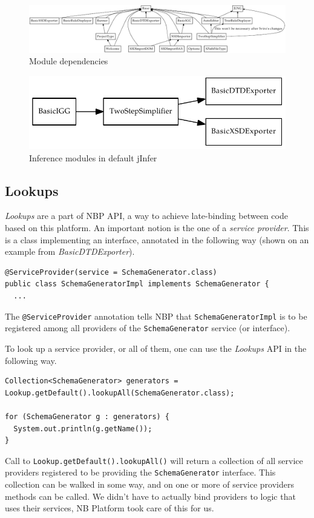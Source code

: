 \documentclass[a4paper,10pt,oneside]{article}
\newcommand{\myscale}{0.74}
\newcommand{\code}[1]{\texttt{#1}}
\newcommand{\jmodule}[1]{\emph{#1}}
\begin{document}
\begin{figure}
	\centering\includegraphics[scale=1]{module_deps}
	\caption{Module dependencies} \label{module_deps}
\end{figure}

\begin{figure}
	\centering\includegraphics[scale=\myscale]{modules_inference}
	\caption{Inference modules in default jInfer} \label{modules_inference}
\end{figure}

\subsection{Lookups} \label{section_lookups}
\emph{Lookups} are a part of NBP API, a way to achieve late-binding between code based on this platform. An important notion is the one of a \emph{service provider}. This is a class implementing an interface, annotated in the following way (shown on an example from \jmodule{BasicDTDExporter}).
\begin{verbatim}
@ServiceProvider(service = SchemaGenerator.class)
public class SchemaGeneratorImpl implements SchemaGenerator {
  ...
\end{verbatim}
The \code{@ServiceProvider} annotation tells NBP that \code{SchemaGeneratorImpl} is to be registered among all providers of the \code{SchemaGenerator} service (or interface).

To look up a service provider, or all of them, one can use the \jmodule{Lookups} API in the following way.
\begin{verbatim}
Collection<SchemaGenerator> generators = Lookup.getDefault().lookupAll(SchemaGenerator.class);

for (SchemaGenerator g : generators) {
  System.out.println(g.getName());
}
\end{verbatim}
Call to \code{Lookup.getDefault().lookupAll()} will return a collection of all service providers registered to be providing the \code{SchemaGenerator} interface. This collection can be walked in some way, and on one or more of service providers methods can be called. We didn't have to actually bind providers to logic that uses their services, NB Platform took care of this for us.
\end{document}
